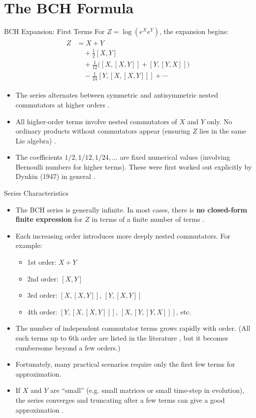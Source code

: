 \documentclass{beamer}
\begin{document}
\section{The BCH Formula}
\begin{frame}{BCH Expansion: First Terms}
  For $Z = \log(e^X e^Y)$, the expansion begins:
\begin{align*}
\begin{split} Z &= X + Y \\ &\quad+ \frac{1}{2}[X, Y] \\ &\quad+ \frac{1}{12}\big([X,[X,Y]] + [Y,[Y,X]]\big) \\ &\quad- \frac{1}{24}[Y,[X,[X,Y]]] + \cdots \end{split}
\end{align*}
\begin{itemize}
\item The series alternates between symmetric and antisymmetric nested commutators at higher orders .
\item All higher-order terms involve nested commutators of $X$ and $Y$ only. No ordinary products without commutators appear (ensuring $Z$ lies in the same Lie algebra) .
\item The coefficients $1/2, 1/12, 1/24, \ldots$ are fixed numerical values (involving Bernoulli numbers for higher terms). These were first worked out explicitly by Dynkin (1947) in general .
\end{itemize}
\end{frame}

\begin{frame}{Series Characteristics}
\begin{itemize}
\item The BCH series is generally infinite. In most cases, there is \textbf{no closed-form finite expression} for $Z$ in terms of a finite number of terms .
\item Each increasing order introduces more deeply nested commutators. For example:
\begin{itemize}
\item 1st order: $X+Y$
\item 2nd order: $[X,Y]$
\item 3rd order: $[X,[X,Y]]$, $[Y,[X,Y]]$
\item 4th order: $[Y,[X,[X,Y]]]$, $[X,[Y,[Y,X]]]$, etc.
\end{itemize}
\item The number of independent commutator terms grows rapidly with order. (All such terms up to 6th order are listed in the literature , but it becomes cumbersome beyond a few orders.)
\item Fortunately, many practical scenarios require only the first few terms for approximation.
\item If $X$ and $Y$ are “small” (e.g. small matrices or small time-step in evolution), the series converges and truncating after a few terms can give a good approximation .
\end{itemize}
\end{frame}
\end{document}
